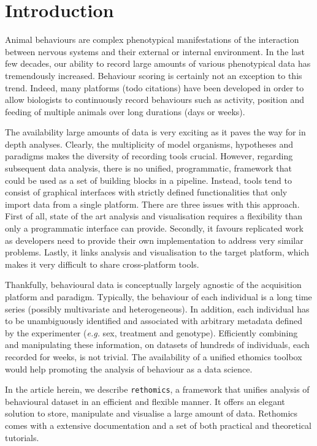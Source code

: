 \documentclass[10pt,letterpaper]{article}
\begin{document}
\linenumbers

\section*{Introduction}

Animal behaviours are complex phenotypical manifestations of the interaction between nervous systems and their external or internal environment.
In the last few decades, our ability to record large amounts of various phenotypical data has tremendously increased.
Behaviour scoring is certainly not an exception to this trend.
Indeed, many platforms (todo citations) have been developed in order to allow biologists to continuously record behaviours such as activity, position and feeding of multiple animals over long durations (days or weeks).

The availability large amounts of data is very exciting as it paves the way for in depth analyses.
Clearly, the multiplicity of model organisms, hypotheses and paradigms makes the diversity of recording tools crucial.
However, regarding subsequent data analysis, there is no unified, programmatic, framework that could be used as a set of building blocks in a pipeline.
Instead, tools tend to consist of graphical interfaces with strictly defined functionalities that only import data from a single platform.
There are three issues with this approach.
First of all, state of the art analysis and visualisation requires a flexibility than only a programmatic interface can provide.
Secondly, it favours replicated work as developers need to provide their own implementation to address very similar problems.
Lastly, it links analysis and visualisation to the target platform, which makes it very difficult to share cross-platform tools.

Thankfully, behavioural data is conceptually largely agnostic of the acquisition platform and paradigm. 	
Typically, the behaviour of each individual is a long time series (possibly multivariate and heterogeneous).
In addition, each individual has to be unambiguously identified and associated with arbitrary metadata defined by the experimenter (\emph{e.g.} sex, treatment and genotype). Efficiently combining and manipulating these information, on datasets of hundreds of individuals, each recorded for weeks, is not trivial. The availability of a unified ethomics toolbox would help promoting the analysis of behaviour as a data science.

In the article herein, we describe \texttt{rethomics}, a framework that unifies analysis of behavioural dataset in an efficient and flexible manner.
It offers an elegant solution to store, manipulate and visualise a large amount of data.
Rethomics comes with a extensive documentation and a set of both practical and theoretical tutorials.
\end{document}
